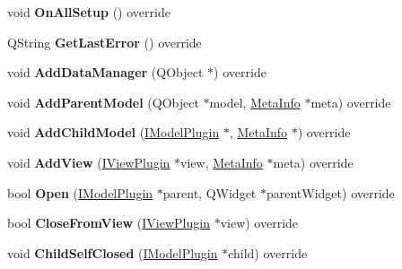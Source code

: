 \begin{DoxyCompactItemize}
\item 
\mbox{\label{class_task_sketch_model_af1c56b3d144468266b5c82297b83852f}} 
void {\bfseries On\+All\+Setup} () override
\item 
\mbox{\label{class_task_sketch_model_a683fcebcaa91cce32a9dbdde28ea249f}} 
Q\+String {\bfseries Get\+Last\+Error} () override
\item 
\mbox{\label{class_task_sketch_model_aa5239531a2b064abdb3c06efbe544c38}} 
void {\bfseries Add\+Data\+Manager} (Q\+Object $\ast$) override
\item 
\mbox{\label{class_task_sketch_model_afae4e68a00b9efbf5f0cff3aea17412a}} 
void {\bfseries Add\+Parent\+Model} (Q\+Object $\ast$model, \hyperlink{struct_meta_info}{Meta\+Info} $\ast$meta) override
\item 
\mbox{\label{class_task_sketch_model_a3a87e79c34a0e67bf1027fffedb43bc4}} 
void {\bfseries Add\+Child\+Model} (\hyperlink{class_i_model_plugin}{I\+Model\+Plugin} $\ast$, \hyperlink{struct_meta_info}{Meta\+Info} $\ast$) override
\item 
\mbox{\label{class_task_sketch_model_a7febb27374b155e86d33543adc350c36}} 
void {\bfseries Add\+View} (\hyperlink{class_i_view_plugin}{I\+View\+Plugin} $\ast$view, \hyperlink{struct_meta_info}{Meta\+Info} $\ast$meta) override
\item 
\mbox{\label{class_task_sketch_model_ace37e6001318e699bdd1a1412628ea90}} 
bool {\bfseries Open} (\hyperlink{class_i_model_plugin}{I\+Model\+Plugin} $\ast$parent, Q\+Widget $\ast$parent\+Widget) override
\item 
\mbox{\label{class_task_sketch_model_a32efbd8dbe71476b9ea223f330ff6cc8}} 
bool {\bfseries Close\+From\+View} (\hyperlink{class_i_view_plugin}{I\+View\+Plugin} $\ast$view) override
\item 
\mbox{\label{class_task_sketch_model_ab64b7d0896769163fb7cb5c786c67efe}} 
void {\bfseries Child\+Self\+Closed} (\hyperlink{class_i_model_plugin}{I\+Model\+Plugin} $\ast$child) override

\end{DoxyCompactItemize}
